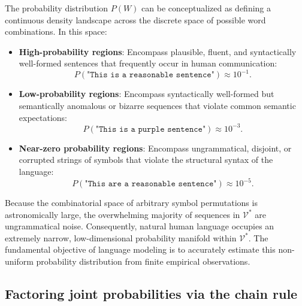 \documentclass[../../../main.tex]{subfiles}
\begin{document}
The probability distribution $P(W)$ can be conceptualized as defining a continuous density landscape across the discrete space of possible word combinations. In this space:
\begin{itemize}
    \item \textbf{High-probability regions}: Encompass plausible, fluent, and syntactically well-formed sentences that frequently occur in human communication:
    \begin{equation}
    P\left(\texttt{"This is a reasonable sentence"}\right) \approx 10^{-1}.
    \end{equation}
    \item \textbf{Low-probability regions}: Encompass syntactically well-formed but semantically anomalous or bizarre sequences that violate common semantic expectations:
    \begin{equation}
    P\left(\texttt{"This is a purple sentence"}\right) \approx 10^{-3}.
    \end{equation}
    \item \textbf{Near-zero probability regions}: Encompass ungrammatical, disjoint, or corrupted strings of symbols that violate the structural syntax of the language:
    \begin{equation}
    P\left(\texttt{"This are a reasonable sentence"}\right) \approx 10^{-5}.
    \end{equation}
\end{itemize}

Because the combinatorial space of arbitrary symbol permutations is astronomically large, the overwhelming majority of sequences in $\mathcal{V}^*$ are ungrammatical noise. Consequently, natural human language occupies an extremely narrow, low-dimensional probability manifold within $\mathcal{V}^*$. The fundamental objective of language modeling is to accurately estimate this non-uniform probability distribution from finite empirical observations.

\subsection{Factoring joint probabilities via the chain rule}
\label{subsec:lm_chain_rule}
\end{document}
